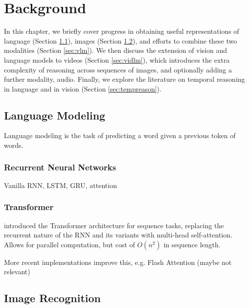 
\chapter{Background}
\label{chap:bg}

In this chapter, we briefly cover progress in obtaining useful representations
of language (Section \ref{sec:lm}), images (Section \ref{sec:imrec}), and
efforts to combine these two modalities (Section \ref{sec:vlm}). We then
discuss the extension of vision and language models to videos (Section
\ref{sec:vidlm}), which introduces the extra complexity of reasoning across
sequences of images, and optionally adding a further modality, audio. Finally,
we explore the literature on temporal reasoning in language and in vision
(Section \ref{sec:tempreason}).

\section{Language Modeling}
\label{sec:lm}

Language modeling is the task of predicting a word given a previous token of
words. 


\subsection{Recurrent Neural Networks}
\label{ssec:rnn}

Vanilla RNN, LSTM, GRU, attention
	
\subsection{Transformer}
\label{ssec:transformer}

\cite{vaswani2017attention} introduced the Transformer architecture for
sequence tasks, replacing the recurrent nature of the RNN and its variants with
multi-head self-attention. Allows for parallel computation, but cost of
$O(n^2)$ in sequence length.

More recent implementations improve this, e.g. Flash Attention (maybe not relevant)

\section{Image Recognition}
\label{sec:imrec}


